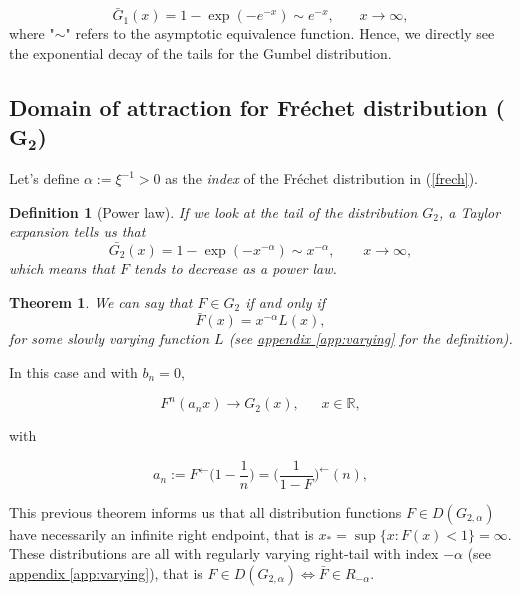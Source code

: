 \documentclass[11pt,a4paper,openany ]{book}
\newtheorem{theorem}{Theorem}[chapter]
\newtheorem{definition}{Definition}[chapter]
\begin{document}
\begin{equation*}
\bar{G}_1(x)=1-\exp(-e^{-x})\sim e^{-x}, \ \ \ \ \ \ \ \ x\to\infty,
\end{equation*}
where "$\sim$" refers to the asymptotic equivalence function. Hence, we directly see the exponential decay of the tails for the Gumbel distribution.

\subsection*{Domain of attraction for Fréchet distribution ($\mathbf{G_{2}}$)}

Let's define $\alpha:=\xi^{-1}>0$ as the \emph{index} of the Fréchet distribution in (\ref{frech}).

\begin{definition}[Power law]
If we look at the tail of the distribution $G_2$, a Taylor expansion tells us that
\begin{equation}\label{eq:powerlaw}
\bar{G_2}(x)=1-\exp (-x^{-\alpha})\sim x^{-\alpha}, \qquad x\to\infty, 
\end{equation}
which means that $F$ tends to decrease as a power law. 
\end{definition}


\begin{theorem}
We can say that $F \in G_{2}$ if and only if 
\begin{equation}
\bar{F}(x)=x^{-\alpha} L(x),
\end{equation}
for some \emph{slowly varying} function $L$ \emph{(see \hyperref[app:varying]{appendix \ref{app:varying}} for the definition)}. 
\end{theorem}

In this case and with $b_n=0$,

\begin{equation*}
F^n(a_nx)\to G_2(x), \ \ \ \ \ \ \  x\in\mathbb{R},
\end{equation*}

with

\begin{equation*}
a_n:=F^{\leftarrow}\Big(1-\frac{1}{n}\Big)=\Big(\frac{1}{1-F}\Big)^{\leftarrow}(n),
\end{equation*}


This previous theorem informs us that all distribution functions $F\in D(G_{2,\alpha})$ have necessarily an infinite right endpoint, that is $x_*=\sup\{x:F(x)<1\}=\infty$. These distributions are all with regularly varying right-tail with index $-\alpha$ (see \hyperref[app:varying]{appendix \ref{app:varying}}), that is $F\in D(G_{2,\alpha})\Longleftrightarrow \bar{F}\in R_{-\alpha}$.
\end{document}
